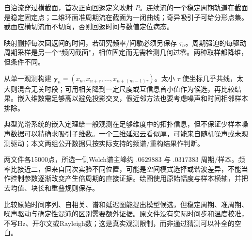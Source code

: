 自治流穿过横截面，首次正向回返定义映射 $P$。连续流的一个稳定周期轨道在截面是稳定固定点；二维环面准周期流在截面为一闭曲线；奇异吸引子可给分形点集。截面应横切流而不切向，否则回返时间与数值定位病态。

映射删掉每次回返间的时间，若研究频率/间歇必须另保存 $\tau_n$。周期强迫的每驱动周期采样是另一个“频闪截面”，相位固定而无需检测几何过零。两种取样都降维，但条件不同。

从单一观测构建 $\mathbf y_n=(x_n,x_{n+\tau},\ldots,x_{n+(m-1)\tau})$。太小 $\tau$ 使坐标几乎共线，太大则混合无关时段；可用相关降到一定尺度或互信息首小值作为候选，再比较结果。嵌入维数需足够高以避免投影交叉，假近邻方法也要考虑噪声和时间相邻样本排除。

典型光滑系统的嵌入定理给一般观测在足够维度中的拓扑信息，但不保证少样本噪声数据可以精确求吸引子维数。一个三维延迟云看似厚，可能来自随机噪声或未观测驱动；本文两组公开数据只按实际支持的频谱/重构结果作判断。

两文件各15000点，所选一侧Welch谱主峰约 $.0629883$ 与 $.0317383$ 周期/样本。频率比接近二，但来自同次实验不同位置，可能是空间模式选择或谐波差异，不能当作控制参数逐渐改变产生倍周期的直接证据。绘图使用原始幅度与样本横轴，并把去均值、块长和重叠规则保存。

比较原始时间序列、自相关、谱和延迟图能提出模型候选，但稳定周期、准周期、噪声驱动与确定性混沌的区别需要额外证据。原文件没有实际时间步和温度校准，不写Hz、开尔文或Rayleigh数；这是真实观测限制，而非通过猜测可以补全的空白。

